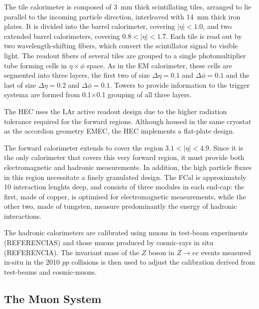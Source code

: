 The tile calorimeter is composed of 3~mm thick scintillating tiles, arranged to lie parallel  to the incoming particle direction, interleaved with 14~mm thick iron plates. %
It is divided into the barrel calorimeter, covering $|\eta|<1.0$, and two extended barrel calorimeters, covering  $0.8 < |\eta| <1.7$. Each tile is read out by two wavelength-shifting fibers, which convert the scintillator signal to visible light. The readout fibers of several tiles are grouped to a single photomultiplier tube forming cells in $\eta \times \phi$ space. As in the EM calorimeter, these cells are segmented into three layers, the first two of size $\Delta \eta = 0.1$ and  $\Delta \phi = 0.1$ and the last of size   $\Delta \eta = 0.2$ and  $\Delta \phi = 0.1$.  Towers to provide information to the trigger systema are formed from 0.1$\times$0.1 grouping of all three layers.

The HEC uses the LAr active readout design due to the higher radiation tolerance required for the forward regions.  Although housed in the same cryostat as the accordion geometry EMEC, the HEC implements a flat-plate design.

The forward calorimeter extends to cover the region $3.1<|\eta|<4.9$. Since it is the only calorimeter that covers this very forward region, it must provide both electromagnetic and hadronic measurements. In addition, the high particle fluxes in this region necessitate a finely granulated design. The FCal is approximately 10 interaction lenghts deep, and consists of three modules in each end-cap: the first, made of copper, is optimised for electromagnetic measurements, while the other two, made of tungsten, measure predominantly the energy of hadronic interactions.

The hadronic calorimeters are calibrated using muons in test-beam experiments (REFERENCIAS) and those muons produced by cosmic-rays in situ (REFERENCIA). The invariant mass of the $Z$ boson in $Z \rightarrow ee$ events measured in-situ in the 2010 $pp$ collisions is then used to adjust the calibration derived from test-beams and cosmic-muons.





\subsection{The Muon System}\label{sec:Muon}
 
